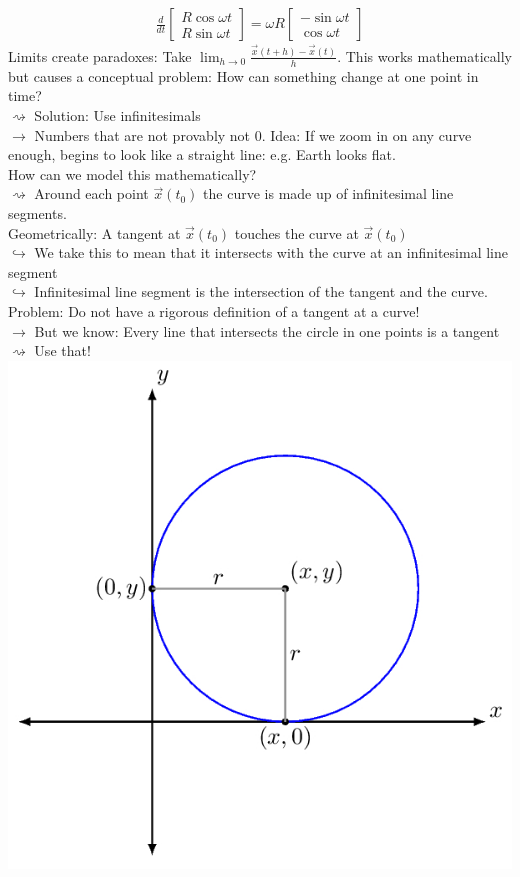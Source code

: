 \documentclass[a4paper,12pt]{article}
\begin{document}
\begin{align*}
\frac{d}{dt} \begin{bmatrix} R \cos \omega t \\ R \sin \omega t \end{bmatrix} = \omega R \begin{bmatrix}
-\sin \omega t \\ \cos \omega t \end{bmatrix}
\end{align*}
Limits create paradoxes:
Take $\lim_{h \to 0} \frac{\vec{x}(t+h)-\vec{x}(t)}{h}$. This works mathematically but causes a conceptual problem: How can something change at one point in time? \\
$\rightsquigarrow$ Solution: Use infinitesimals \\ 
$\rightarrow$ Numbers that are not provably not 0. 
Idea: If we zoom in on any curve enough, begins to look like a straight line: e.g. Earth looks flat. \\
How can we model this mathematically? \\
$\rightsquigarrow$ Around each point $\vec{x}(t_0)$ the curve is made up of infinitesimal line segments. \\
Geometrically: A tangent at $\vec{x}(t_0)$ touches the curve at $\vec{x}(t_0)$ \\ 
$\hookrightarrow$ We take this to mean that it intersects with the curve at an infinitesimal line segment \\
$\hookrightarrow$ Infinitesimal line segment is the intersection of the tangent and the curve. \\
Problem: Do not have a rigorous definition of a tangent at a curve! \\
$\rightarrow$ But we know: Every line that intersects the circle in one points is a tangent $\rightsquigarrow$ Use that!
\\ \includegraphics[scale=0.4]{circle_tangent} \\
\end{document}
